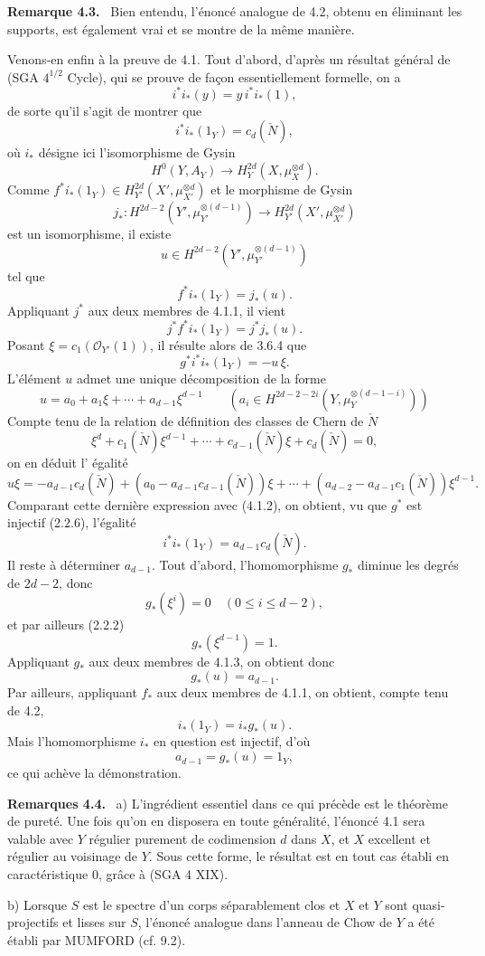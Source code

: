 \documentclass[11pt]{article}
\newenvironment{statement}[1]{\par\medskip\noindent\textbf{#1.}\ }{\par\medskip}
\begin{document}
\begin{statement}{Remarque 4.3}
Bien entendu, l'énoncé analogue de 4.2, obtenu en éliminant les supports, est également vrai et se montre de la même manière.
\end{statement}

Venons-en enfin à la preuve de 4.1. Tout d'abord, d'après un résultat général de (SGA $4^{1/2}$ Cycle), qui se prouve de façon essentiellement formelle, on a
\[
i^*i_*(y)=y\,i^*i_*(1),
\]
de sorte qu'il s'agit de montrer que
\[
i^*i_*(1_Y)=c_d(\check N),
\]
où $i_*$ désigne ici l'isomorphisme de Gysin
\[
H^0(Y,A_Y)\to H_Y^{2d}(X,\mu_X^{\otimes d}).
\]
Comme $f^*i_*(1_Y)\in H_{Y'}^{2d}(X',\mu_{X'}^{\otimes d})$ et le morphisme de Gysin
\[
j_*:H^{2d-2}(Y',\mu_{Y'}^{\otimes(d-1)})
\to H_{Y'}^{2d}(X',\mu_{X'}^{\otimes d})
\]
est un isomorphisme, il existe
\[
u\in H^{2d-2}(Y',\mu_{Y'}^{\otimes(d-1)})
\]
tel que
\[
f^*i_*(1_Y)=j_*(u).
\tag{4.1.1}
\]
Appliquant $j^*$ aux deux membres de 4.1.1, il vient
\[
j^*f^*i_*(1_Y)=j^*j_*(u).
\]
Posant $\xi=c_1(\mathcal O_{Y'}(1))$, il résulte alors de 3.6.4 que
\[
g^*i^*i_*(1_Y)=-u\,\xi.
\tag{4.1.2}
\]
L'élément $u$ admet une unique décomposition de la forme
\[
u=a_0+a_1\xi+\cdots+a_{d-1}\xi^{d-1}
\qquad
(a_i\in H^{2d-2-2i}(Y,\mu_Y^{\otimes(d-1-i)}))
\tag{4.1.3}
\]
Compte tenu de la relation de définition des classes de Chern de $\check N$
\[
\xi^d+c_1(\check N)\xi^{d-1}+\cdots+c_{d-1}(\check N)\xi+c_d(\check N)=0,
\tag{4.1.4}
\]
on en déduit l'%
égalité
\[
u\xi=-a_{d-1}c_d(\check N)+(a_0-a_{d-1}c_{d-1}(\check N))\xi
+\cdots+(a_{d-2}-a_{d-1}c_1(\check N))\xi^{d-1}.
\]
Comparant cette dernière expression avec (4.1.2), on obtient, vu que $g^*$ est injectif (2.2.6), l'égalité
\[
i^*i_*(1_Y)=a_{d-1}c_d(\check N).
\tag{4.1.5}
\]
Il reste à déterminer $a_{d-1}$. Tout d'abord, l'homomorphisme $g_*$ diminue les degrés de $2d-2$, donc
\[
g_*(\xi^i)=0\quad(0\le i\le d-2),
\]
et par ailleurs (2.2.2)
\[
g_*(\xi^{d-1})=1.
\]
Appliquant $g_*$ aux deux membres de 4.1.3, on obtient donc
\[
g_*(u)=a_{d-1}.
\tag{4.1.6}
\]
Par ailleurs, appliquant $f_*$ aux deux membres de 4.1.1, on obtient, compte tenu de 4.2,
\[
i_*(1_Y)=i_*g_*(u).
\tag{4.1.7}
\]
Mais l'homomorphisme $i_*$ en question est injectif, d'où
\[
a_{d-1}=g_*(u)=1_Y,
\]
ce qui achève la démonstration.

\begin{statement}{Remarques 4.4}
a) L'ingrédient essentiel dans ce qui précède est le théorème de pureté. Une fois qu'on en disposera en toute généralité, l'énoncé 4.1 sera valable avec $Y$ régulier purement de codimension $d$ dans $X$, et $X$ excellent et régulier au voisinage de $Y$. Sous cette forme, le résultat est en tout cas établi en caractéristique $0$, grâce à (SGA 4 XIX).

b) Lorsque $S$ est le spectre d'un corps séparablement clos et $X$ et $Y$
sont quasi-projectifs et lisses sur $S$, l'énoncé analogue dans l'anneau de Chow de $Y$ a été établi par MUMFORD (cf. 9.2).
\end{statement}
\end{document}
